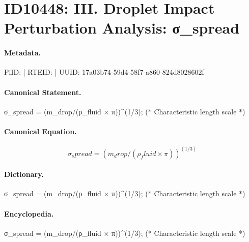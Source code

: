 \section*{ID10448: III. Droplet Impact Perturbation Analysis: σ\_spread}
\paragraph{Metadata.}
PiID:  | RTEID:  | UUID: 17a03b74-59d4-58f7-a860-824d8028602f

\paragraph{Canonical Statement.}
σ\_spread = (m\_drop/(ρ\_fluid × π))\textasciicircum{}(1/3); (* Characteristic length scale *)

\paragraph{Canonical Equation.}
\[
σ_spread = (m_drop/(ρ_fluid × π))^(1/3)
\]

\paragraph{Dictionary.}
σ\_spread = (m\_drop/(ρ\_fluid × π))\textasciicircum{}(1/3); (* Characteristic length scale *)

\paragraph{Encyclopedia.}
σ\_spread = (m\_drop/(ρ\_fluid × π))\textasciicircum{}(1/3); (* Characteristic length scale *)
